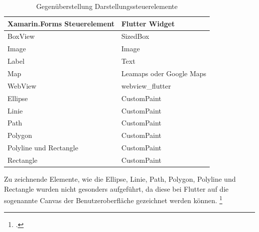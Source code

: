 \begin{table}[!ht]
\begin{tabularx}{\textwidth}{X|X}
   \textbf{Xamarin.Forms Steuerelement} & \textbf{Flutter Widget}  \\
\hline
	BoxView		       			&   	 SizedBox  		\\ 
	Image       						&	     Image	 			\\ 
	Label       						&  	Text 					\\ 
	Map            					&	   	Leamaps oder Google Maps \\ 
	WebView            			&  	webview\_flutter	\\ 
	Ellipse							&  	CustomPaint	\\ 
	Linie								&	  	CustomPaint	\\ 
	Path  							&  	CustomPaint	\\ 
	Polygon  						&  	CustomPaint	\\ 
	Polyline und Rectangle  &  	CustomPaint	\\ 
	Rectangle  					&  	CustomPaint	\\ 

\end{tabularx}
\caption{Gegenüberstellung Darstellungssteuerelemente}
 \label{tab:ControlsVisualization}
\end{table}
Zu zeichnende Elemente, wie die  \glq Ellipse\grq{}, \glq Linie\grq{}, \glq Path\grq{},  \glq Polygon\grq{},  \glq Polyline\grq{}  und \glq Rectangle\grq{} wurden nicht gesonders aufgeführt,  da diese bei Flutter auf die sogenannte Canvas der Benutzeroberfläche gezeichnet werden können.  \footcite[Vgl.][Abgerufen am \today]{GoogleFlutterCanvas2020} 

